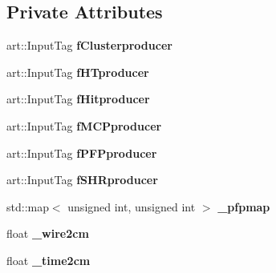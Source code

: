 \subsection*{Private Attributes}
\begin{DoxyCompactItemize}
\item 
art\+::\+Input\+Tag {\bfseries f\+Clusterproducer}\hypertarget{classProtonHitPurity_a9cde3bb38128414175bdec828c258628}{}\label{classProtonHitPurity_a9cde3bb38128414175bdec828c258628}

\item 
art\+::\+Input\+Tag {\bfseries f\+H\+Tproducer}\hypertarget{classProtonHitPurity_a67a39931d4884a9b8551d5158f37c954}{}\label{classProtonHitPurity_a67a39931d4884a9b8551d5158f37c954}

\item 
art\+::\+Input\+Tag {\bfseries f\+Hitproducer}\hypertarget{classProtonHitPurity_a7285b631733a327b17852217edcf130c}{}\label{classProtonHitPurity_a7285b631733a327b17852217edcf130c}

\item 
art\+::\+Input\+Tag {\bfseries f\+M\+C\+Pproducer}\hypertarget{classProtonHitPurity_a582ca83452036a5a15bde53595858dab}{}\label{classProtonHitPurity_a582ca83452036a5a15bde53595858dab}

\item 
art\+::\+Input\+Tag {\bfseries f\+P\+F\+Pproducer}\hypertarget{classProtonHitPurity_a58af404af2943b95545b5435f984b34c}{}\label{classProtonHitPurity_a58af404af2943b95545b5435f984b34c}

\item 
art\+::\+Input\+Tag {\bfseries f\+S\+H\+Rproducer}\hypertarget{classProtonHitPurity_ae02e24d9473737eba23b266383f240b0}{}\label{classProtonHitPurity_ae02e24d9473737eba23b266383f240b0}

\item 
std\+::map$<$ unsigned int, unsigned int $>$ {\bfseries \+\_\+pfpmap}\hypertarget{classProtonHitPurity_abaa0fd0f88cca733f6e1f58248d22e9b}{}\label{classProtonHitPurity_abaa0fd0f88cca733f6e1f58248d22e9b}

\item 
float {\bfseries \+\_\+wire2cm}\hypertarget{classProtonHitPurity_a6dd665c27aa4b6da7b90127e1fb2d773}{}\label{classProtonHitPurity_a6dd665c27aa4b6da7b90127e1fb2d773}

\item 
float {\bfseries \+\_\+time2cm}\hypertarget{classProtonHitPurity_a8c08fb55f794adf3214370e803bb5a00}{}\label{classProtonHitPurity_a8c08fb55f794adf3214370e803bb5a00}


\end{DoxyCompactItemize}
